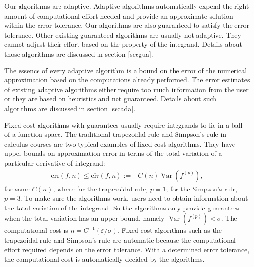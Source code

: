 \documentclass{iitthesis}
\DeclareMathOperator{\Var}{Var}
\theoremstyle{definition}
\theoremstyle{remark}
\begin{document}
Our algorithms are adaptive. Adaptive algorithms automatically expend the right amount of computational effort needed and provide an approximate solution within the error tolerance. Our algorithms are also guaranteed to satisfy the error tolerance. Other existing guaranteed algorithms are usually not adaptive. They cannot adjust their effort based on the property of the integrand. Details about those algorithms are discussed in section \ref{secgua}.

The essence of every adaptive algorithm is a bound on the error of the numerical approximation based on the computations already performed. The error estimates of existing adaptive algorithms either require too much information from the user or they are based on heuristics and not guaranteed. Details about such algorithms are discussed in section \ref{secada}.

\label{secgua}

Fixed-cost algorithms with guarantees usually require integrands to lie in a ball of a function space. The traditional trapezoidal rule and Simpson's rule in calculus courses are two typical examples of fixed-cost algorithms. They have upper bounds on approximation error in terms of the total variation of a particular derivative of integrand:
\begin{align}\label{errorsimple}
    \text{err}(f,n)\le\overline{\text{err}}(f,n):=&C(n)\Var(f^{(p)}),
\end{align}
for some $C(n)$, where for the trapezoidal rule, $p=1$; for the Simpson's rule, $p=3$. To make sure the algorithms work, users need to obtain information about the total variation of the integrand. So the algorithms only provide guarantees when the total variation has an upper bound, namely $\Var(f^{(p)})<\sigma$. The computational cost is $n=C^{-1}(\varepsilon/\sigma)$. Fixed-cost algorithms such as the trapezoidal rule and Simpson's rule are automatic because the computational effort required depends on the error tolerance. With a determined error tolerance, the computational cost is automatically decided by the algorithms.
\end{document}
